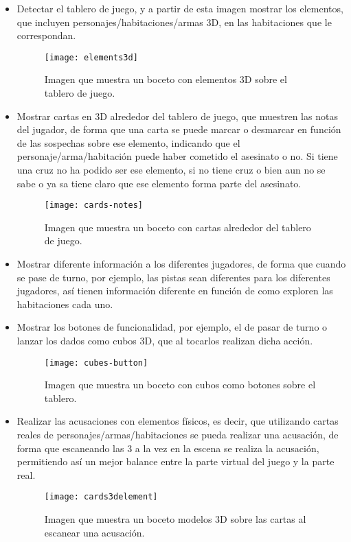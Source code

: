 \begin{itemize}
  \item Detectar el tablero de juego, y a partir de esta imagen mostrar los elementos, que incluyen personajes/habitaciones/armas 3D, en las habitaciones que le correspondan.

  \begin{figure}[h]
    \centering
    \texttt{[image: elements3d]}
    \caption{Imagen que muestra un boceto con elementos 3D sobre el tablero de juego.}
    \label{figura-elements3d}
  \end{figure}

  \item Mostrar cartas en 3D alrededor del tablero de juego, que muestren las notas del jugador, de forma que una carta se puede marcar o desmarcar en función de las sospechas sobre ese elemento, indicando que el personaje/arma/habitación puede haber cometido el asesinato o no. Si tiene una cruz no ha podido ser ese elemento, si no tiene cruz o bien aun no se sabe o ya sa tiene claro que ese elemento forma parte del asesinato.

  \begin{figure}[h]
    \centering
    \texttt{[image: cards-notes]}
    \caption{Imagen que muestra un boceto con cartas alrededor del tablero de juego.}
    \label{figura-cards-notes}
  \end{figure}

  \newpage

  \item Mostrar diferente información a los diferentes jugadores, de forma que cuando se pase de turno, por ejemplo, las pistas sean diferentes para los diferentes jugadores, así tienen información diferente en función de como exploren las habitaciones cada uno.
  \item Mostrar los botones de funcionalidad, por ejemplo, el de pasar de turno o lanzar los dados como cubos 3D, que al tocarlos realizan dicha acción.

  \begin{figure}[h]
    \centering
    \texttt{[image: cubes-button]}
    \caption{Imagen que muestra un boceto con cubos como botones sobre el tablero.}
    \label{figura-cubes-button}
  \end{figure}

  \newpage

  \item Realizar las acusaciones con elementos físicos, es decir, que utilizando cartas reales de personajes/armas/habitaciones se pueda realizar una acusación, de forma que escaneando las 3 a la vez en la escena se realiza la acusación, permitiendo así un mejor balance entre la parte virtual del juego y la parte real.

  \begin{figure}[h]
    \centering
    \texttt{[image: cards3delement]}
    \caption{Imagen que muestra un boceto modelos 3D sobre las cartas al escanear una acusación.}
    \label{figura-cards3delement}
  \end{figure}

\end{itemize}
